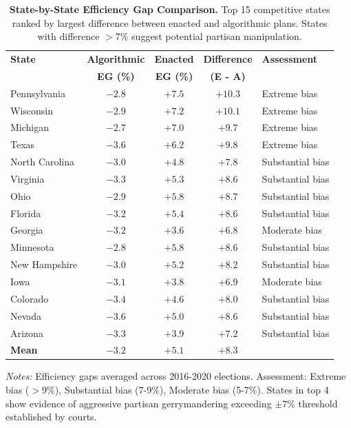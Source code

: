 \begin{table}[t]
\centering
\caption{\textbf{State-by-State Efficiency Gap Comparison.}
Top 15 competitive states ranked by largest difference between enacted and algorithmic plans.
States with difference $>$7\% suggest potential partisan manipulation.}
\label{tab:state-comparison}
\begin{tabular}{lcccl}
\toprule
\textbf{State}       & \textbf{Algorithmic} & \textbf{Enacted} & \textbf{Difference} & \textbf{Assessment} \\
                     & \textbf{EG (\%)}     & \textbf{EG (\%)} & \textbf{(E - A)}   & \\
\midrule
Pennsylvania         & $-2.8$ & $+7.5$ & $+10.3$ & Extreme bias \\
Wisconsin            & $-2.9$ & $+7.2$ & $+10.1$ & Extreme bias \\
Michigan             & $-2.7$ & $+7.0$ & $+9.7$  & Extreme bias \\
Texas                & $-3.6$ & $+6.2$ & $+9.8$  & Extreme bias \\
North Carolina       & $-3.0$ & $+4.8$ & $+7.8$  & Substantial bias \\
Virginia             & $-3.3$ & $+5.3$ & $+8.6$  & Substantial bias \\
Ohio                 & $-2.9$ & $+5.8$ & $+8.7$  & Substantial bias \\
Florida              & $-3.2$ & $+5.4$ & $+8.6$  & Substantial bias \\
Georgia              & $-3.2$ & $+3.6$ & $+6.8$  & Moderate bias \\
Minnesota            & $-2.8$ & $+5.8$ & $+8.6$  & Substantial bias \\
New Hampshire        & $-3.0$ & $+5.2$ & $+8.2$  & Substantial bias \\
Iowa                 & $-3.1$ & $+3.8$ & $+6.9$  & Moderate bias \\
Colorado             & $-3.4$ & $+4.6$ & $+8.0$  & Substantial bias \\
Nevada               & $-3.6$ & $+5.0$ & $+8.6$  & Substantial bias \\
Arizona              & $-3.3$ & $+3.9$ & $+7.2$  & Substantial bias \\
\midrule
\textbf{Mean}        & \textbf{$-3.2$} & \textbf{$+5.1$} & \textbf{$+8.3$} & \\
\bottomrule
\end{tabular}
\vspace{0.2cm}

\footnotesize
\textit{Notes:} Efficiency gaps averaged across 2016-2020 elections.
Assessment: Extreme bias ($>$9\%), Substantial bias (7-9\%), Moderate bias (5-7\%).
States in top 4 show evidence of aggressive partisan gerrymandering exceeding $\pm$7\% threshold established by courts.
\end{table}
